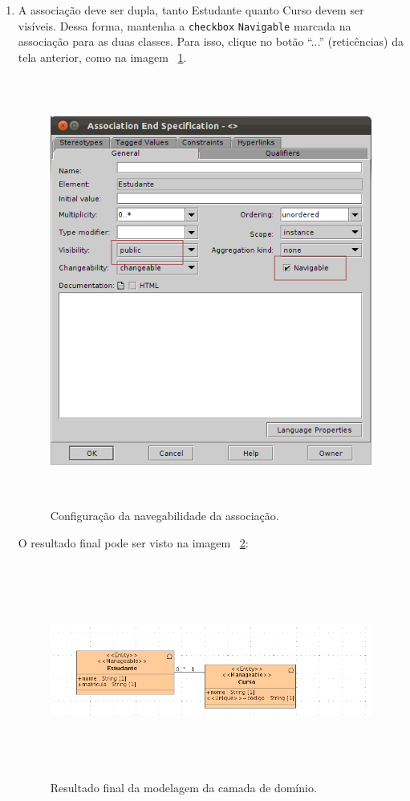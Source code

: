 \begin{enumerate}
\item A associação deve ser dupla, tanto Estudante quanto Curso devem ser
visíveis. Dessa forma, mantenha a \texttt{checkbox} \texttt{Navigable} marcada na associação para
as duas classes. Para isso, clique no botão “...” (reticências) da tela
anterior, como na imagem ~\ref{config_navigable_associacao}.
\begin{figure}[!htb]
	\centering
	\includegraphics[width=350pt,height=400pt]{imgs/tutorial-mdarte-0006.png}
	\caption{Configuração da navegabilidade da associação.}
	\label{config_navigable_associacao}
\end{figure}
		
O resultado final pode ser visto na imagem ~\ref{resultado_diagrama_classe}: \hfill
\begin{figure}[!htb]
	\centering
	\includegraphics[width=500pt,height=200pt]{imgs/tutorial-mdarte-0007.png}
	\caption{Resultado final da modelagem da camada de domínio.}
	\label{resultado_diagrama_classe}
\end{figure}
	

\end{enumerate}
